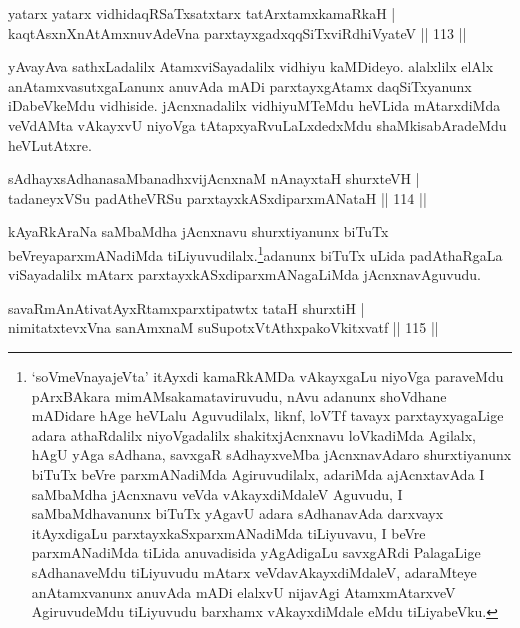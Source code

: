 
\begin{shl}
yatarx yatarx vidhidaqRSaTxsatxtarx tatArx\s \s tamxkamaRkaH |\\
kaqtAsxnXnAtAmxnuvAdeVna parxtayxgadxqqSiTxviRdhiVyateV \hfill || 113 ||
\end{shl}

\begin{artha}
yAvayAva sathxLadalilx AtamxviSayadalilx vidhiyu kaMDideyo. alalxlilx elAlx anAtamxvasutxgaLanunx anuvAda mADi parxtayxgAtamx daqSiTxyanunx iDabeVkeMdu vidhiside. jAcnxnadalilx vidhiyuMTeMdu heVLida mAtarxdiMda veVdAMta vAkayxvU niyoVga tAtapxyaRvuLaLxdedxMdu shaMkisabAradeMdu heVLutAtxre. 
\end{artha}


\begin{shl}
sAdhayxsAdhanasaMbanadhxvijAcnxnaM nAnayxtaH shurxteVH |\\
tadaneyxVSu padAtheVRSu parxtayxkASxdiparxmANataH \hfill || 114 ||
\end{shl}

\begin{artha}
kAyaRkAraNa saMbaMdha jAcnxnavu shurxtiyanunx biTuTx beVreyaparxmANadiMda tiLiyuvudilalx.\footnote{`soVmeVnayajeVta' itAyxdi kamaRkAMDa vAkayxgaLu niyoVga paraveMdu pArxBAkara mimAMsakamataviruvudu, nAvu adanunx shoVdhane mADidare hAge heVLalu Aguvudilalx, liknf, loVTf tavayx  parxtayxyagaLige adara athaRdalilx niyoVgadalilx shakitxjAcnxnavu loVkadiMda Agilalx, hAgU yAga sAdhana, savxgaR sAdhayxveMba jAcnxnavAdaro shurxtiyanunx biTuTx beVre parxmANadiMda Agiruvudilalx, adariMda ajAcnxtavAda I saMbaMdha jAcnxnavu veVda vAkayxdiMdaleV Aguvudu, I saMbaMdhavanunx biTuTx yAgavU adara sAdhanavAda darxvayx itAyxdigaLu parxtayxkaSxparxmANadiMda tiLiyuvavu, I beVre parxmANadiMda tiLida anuvadisida yAgAdigaLu savxgARdi PalagaLige sAdhanaveMdu tiLiyuvudu mAtarx veVdavAkayxdiMdaleV, adaraMteye anAtamxvanunx anuvAda mADi elalxvU nijavAgi AtamxmAtarxveV AgiruvudeMdu tiLiyuvudu barxhamx vAkayxdiMdale eMdu tiLiyabeVku.}adanunx biTuTx uLida padAthaRgaLa viSayadalilx mAtarx parxtayxkASxdiparxmANagaLiMda jAcnxnavAguvudu.
\end{artha}

\begin{shl}
savaRmAnAtivatAyxRtamxparxtipatwtx tataH shurxtiH |\\
nimitatxtevxVna sanAmxnaM suSupotxVtAthxpakoVkitxvatf \hfill || 115 ||
\end{shl}

